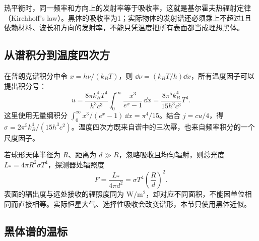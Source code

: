 热平衡时，同一频率和方向上的发射率等于吸收率，这就是基尔霍夫热辐射定律（Kirchhoff's law）。黑体的吸收率为1；实际物体的发射谱还必须乘上不超过1且依赖材料、波长和方向的发射率，不能只凭温度把所有表面都当成理想黑体。


\subsection{从谱积分到温度四次方}
在普朗克谱积分中令 $x=h\nu/(k_BT)$，则 $\dd\nu=(k_BT/h)\dd x$，所有温度因子可以提出积分号：
\[
 u=\frac{8\pi k_B^4T^4}{h^3c^3}
 \int_0^\infty\frac{x^3}{e^x-1}\,\dd x
 =\frac{8\pi^5k_B^4}{15h^3c^3}T^4.
\]
这里使用无量纲积分 $\int_0^\infty x^3/(e^x-1)\,\dd x=\pi^4/15$。结合 $j=cu/4$，得
$\sigma=2\pi^5k_B^4/(15h^3c^2)$。温度四次方既来自谱中的三次幂，也来自频率积分的一个尺度因子。

若球形天体半径为 $R$、距离为 $d\gg R$，忽略吸收且均匀辐射，则总光度 $L_*=4\pi R^2\sigma T^4$，探测器处辐照度
\[
 F=\frac{L_*}{4\pi d^2}=\sigma T^4\left(\frac Rd\right)^2.
\]
表面的辐出度与远处接收的辐照度同为 $\mathrm{W/m^2}$，却对应不同面积，不能因单位相同而直接相等。实际恒星大气、选择性吸收会改变谱形，本节只使用黑体近似。

\subsection{黑体谱的温标}

